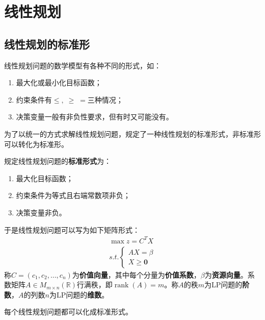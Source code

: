 \section{线性规划}

\subsection{线性规划的标准形}
线性规划问题的数学模型有各种不同的形式，如：
\begin{enumerate}
	\item 最大化或最小化目标函数；
	\item 约束条件有$\leqslant,\;\geqslant\;=$三种情况；
	\item 决策变量一般有非负性要求，但有时又可能没有。
\end{enumerate}
为了以统一的方式求解线性规划问题，规定了一种线性规划的标准形式，非标准形可以转化为标准形。
\begin{definition}
	规定线性规划问题的\textbf{标准形式}为：
	\begin{enumerate}
		\item 最大化目标函数；
		\item 约束条件为等式且右端常数项非负；
		\item 决策变量非负。
	\end{enumerate}
	于是线性规划问题可以写为如下矩阵形式：
	\begin{gather*}
		\max z=C^TX \\
		s.t.
		\begin{cases}
			AX=\beta \\
			X\geqslant\mathbf{0}
		\end{cases}
	\end{gather*}
	称$C=(c_1,c_2,\dots,c_n)$为\textbf{价值向量}，其中每个分量为\textbf{价值系数}，$\beta$为\textbf{资源向量}。系数矩阵$A\in M_{m\times n}(\mathbb{R})$行满秩，即$\operatorname{rank}(A)=m$。称$A$的秩$m$为LP问题的\textbf{阶数}，$A$的列数$n$为LP问题的\textbf{维数}。
\end{definition}
\begin{theorem}
	每个线性规划问题都可以化成标准形式。
\end{theorem}
